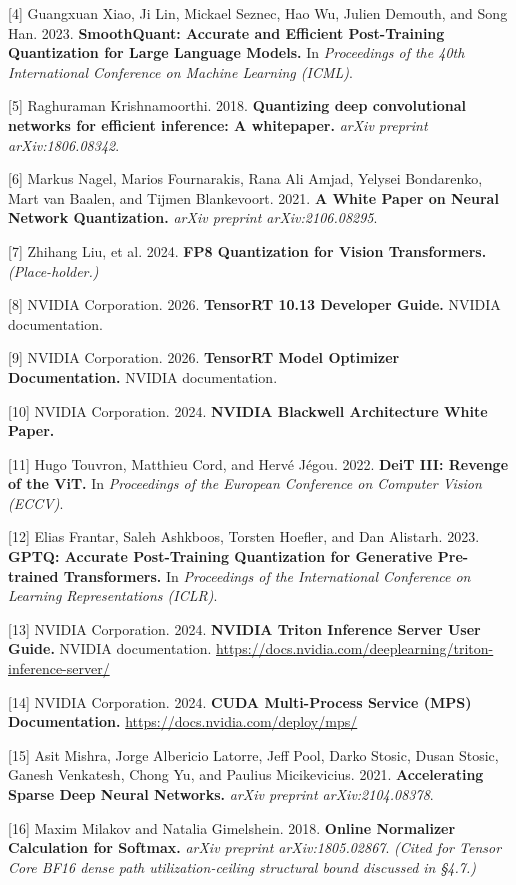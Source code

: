 \documentclass[
]{article}
\begin{document}
{[}4{]} Guangxuan Xiao, Ji Lin, Mickael Seznec, Hao Wu, Julien Demouth,
and Song Han. 2023. \textbf{SmoothQuant: Accurate and Efficient
Post-Training Quantization for Large Language Models.} In
\emph{Proceedings of the 40th International Conference on Machine
Learning (ICML)}.

{[}5{]} Raghuraman Krishnamoorthi. 2018. \textbf{Quantizing deep
convolutional networks for efficient inference: A whitepaper.}
\emph{arXiv preprint arXiv:1806.08342}.

{[}6{]} Markus Nagel, Marios Fournarakis, Rana Ali Amjad, Yelysei
Bondarenko, Mart van Baalen, and Tijmen Blankevoort. 2021. \textbf{A
White Paper on Neural Network Quantization.} \emph{arXiv preprint
arXiv:2106.08295}.

{[}7{]} Zhihang Liu, et al. 2024. \textbf{FP8 Quantization for Vision
Transformers.} \emph{(Place-holder.)}

{[}8{]} NVIDIA Corporation. 2026. \textbf{TensorRT 10.13 Developer
Guide.} NVIDIA documentation.

{[}9{]} NVIDIA Corporation. 2026. \textbf{TensorRT Model Optimizer
Documentation.} NVIDIA documentation.

{[}10{]} NVIDIA Corporation. 2024. \textbf{NVIDIA Blackwell Architecture
White Paper.}

{[}11{]} Hugo Touvron, Matthieu Cord, and Hervé Jégou. 2022.
\textbf{DeiT III: Revenge of the ViT.} In \emph{Proceedings of the
European Conference on Computer Vision (ECCV)}.

{[}12{]} Elias Frantar, Saleh Ashkboos, Torsten Hoefler, and Dan
Alistarh. 2023. \textbf{GPTQ: Accurate Post-Training Quantization for
Generative Pre-trained Transformers.} In \emph{Proceedings of the
International Conference on Learning Representations (ICLR)}.

{[}13{]} NVIDIA Corporation. 2024. \textbf{NVIDIA Triton Inference
Server User Guide.} NVIDIA documentation.
\url{https://docs.nvidia.com/deeplearning/triton-inference-server/}

{[}14{]} NVIDIA Corporation. 2024. \textbf{CUDA Multi-Process Service
(MPS) Documentation.} \url{https://docs.nvidia.com/deploy/mps/}

{[}15{]} Asit Mishra, Jorge Albericio Latorre, Jeff Pool, Darko Stosic,
Dusan Stosic, Ganesh Venkatesh, Chong Yu, and Paulius Micikevicius.
2021. \textbf{Accelerating Sparse Deep Neural Networks.} \emph{arXiv
preprint arXiv:2104.08378}.

{[}16{]} Maxim Milakov and Natalia Gimelshein. 2018. \textbf{Online
Normalizer Calculation for Softmax.} \emph{arXiv preprint
arXiv:1805.02867}. \emph{(Cited for Tensor Core BF16 dense path
utilization-ceiling structural bound discussed in §4.7.)}
\end{document}
